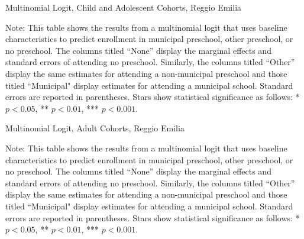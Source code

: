 \begin{table}[H] 
\centering
\caption{Multinomial Logit, Child and Adolescent Cohorts, Reggio Emilia} \label{mlogit-chi-ado-RE}
\begin{adjustbox}{width=\textwidth}
\begin{threeparttable}

\begin{tablenotes}
\footnotesize\raggedright{Note: This table shows the results from a multinomial logit that uses baseline characteristics to predict enrollment in municipal preschool, other preschool, or no preschool. The columns titled ``None'' display the marginal effects and standard errors of attending no preschool. Similarly, the columns titled ``Other'' display the same estimates for attending a non-municipal preschool and those titled ``Municipal" display estimates for attending a municipal school. Standard errors are reported in parentheses. Stars show statistical significance as follows: * $p < 0.05$, ** $p < 0.01$, *** $p < 0.001$.}
\end{tablenotes}
\end{threeparttable}
\end{adjustbox}
\end{table}

\begin{table}[H] 
\centering
\caption{Multinomial Logit, Adult Cohorts, Reggio Emilia} \label{mlogit-adult-RE}
\begin{adjustbox}{width=\textwidth}
\begin{threeparttable}

\begin{tablenotes}
\footnotesize\raggedright{Note: This table shows the results from a multinomial logit that uses baseline characteristics to predict enrollment in municipal preschool, other preschool, or no preschool. The columns titled ``None'' display the marginal effects and standard errors of attending no preschool. Similarly, the columns titled ``Other'' display the same estimates for attending a non-municipal preschool and those titled ``Municipal" display estimates for attending a municipal school. Standard errors are reported in parentheses. Stars show statistical significance as follows: * $p < 0.05$, ** $p < 0.01$, *** $p < 0.001$.}
\end{tablenotes}
\end{threeparttable}
\end{adjustbox}
\end{table}

